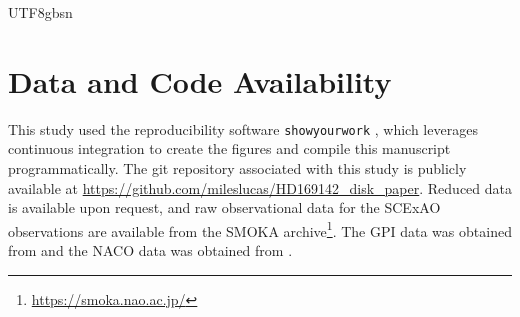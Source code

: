 \documentclass[twocolumn,twocolappendix]{aastex631}
\begin{document}
\begin{CJK*}{UTF8}{gbsn}


\appendix




\section{Data and Code Availability}
This study used the reproducibility software \texttt{showyourwork} \citep{luger_mapping_2021}, which leverages continuous integration to create the figures and compile this manuscript programmatically. The git repository associated with this study is publicly available at \url{https://github.com/mileslucas/HD169142_disk_paper}. Reduced data is available upon request, and raw observational data for the SCExAO observations are available from the SMOKA archive\footnote{\url{https://smoka.nao.ac.jp/}}. The GPI data was obtained from \citet{rich_vizier_2022} and the NACO data was obtained from \citet{de_regt_vizier_2024}.


\end{CJK*}
\end{document}
